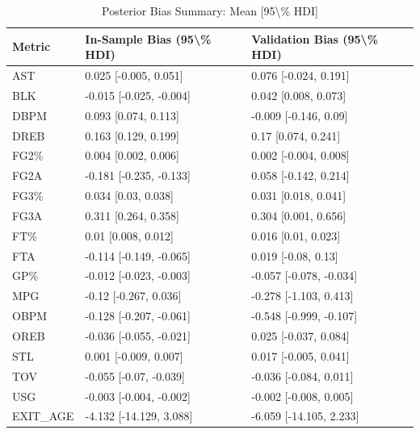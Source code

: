 \begin{table}[t]
\caption*{
{\fontsize{20}{25}\selectfont  Posterior Bias Summary: Mean [95\textbackslash{}\% HDI]\fontsize{12}{15}\selectfont }
} 
\fontsize{12.0pt}{14.0pt}\selectfont
\begin{tabular*}{\linewidth}{@{\extracolsep{\fill}}lll}
\toprule
Metric & In-Sample Bias (95\textbackslash{}\% HDI) & Validation Bias (95\textbackslash{}\% HDI) \\ 
\midrule\addlinespace[2.5pt]
AST & 0.025 [-0.005, 0.051] & 0.076 [-0.024, 0.191] \\ 
BLK & -0.015 [-0.025, -0.004] & 0.042 [0.008, 0.073] \\ 
DBPM & 0.093 [0.074, 0.113] & -0.009 [-0.146, 0.09] \\ 
DREB & 0.163 [0.129, 0.199] & 0.17 [0.074, 0.241] \\ 
FG2\% & 0.004 [0.002, 0.006] & 0.002 [-0.004, 0.008] \\ 
FG2A & -0.181 [-0.235, -0.133] & 0.058 [-0.142, 0.214] \\ 
FG3\% & 0.034 [0.03, 0.038] & 0.031 [0.018, 0.041] \\ 
FG3A & 0.311 [0.264, 0.358] & 0.304 [0.001, 0.656] \\ 
FT\% & 0.01 [0.008, 0.012] & 0.016 [0.01, 0.023] \\ 
FTA & -0.114 [-0.149, -0.065] & 0.019 [-0.08, 0.13] \\ 
GP\% & -0.012 [-0.023, -0.003] & -0.057 [-0.078, -0.034] \\ 
MPG & -0.12 [-0.267, 0.036] & -0.278 [-1.103, 0.413] \\ 
OBPM & -0.128 [-0.207, -0.061] & -0.548 [-0.999, -0.107] \\ 
OREB & -0.036 [-0.055, -0.021] & 0.025 [-0.037, 0.084] \\ 
STL & 0.001 [-0.009, 0.007] & 0.017 [-0.005, 0.041] \\ 
TOV & -0.055 [-0.07, -0.039] & -0.036 [-0.084, 0.011] \\ 
USG & -0.003 [-0.004, -0.002] & -0.002 [-0.008, 0.005] \\ 
EXIT\_AGE & -4.132 [-14.129, 3.088] & -6.059 [-14.105, 2.233] \\ 
\bottomrule
\end{tabular*}
\end{table}

